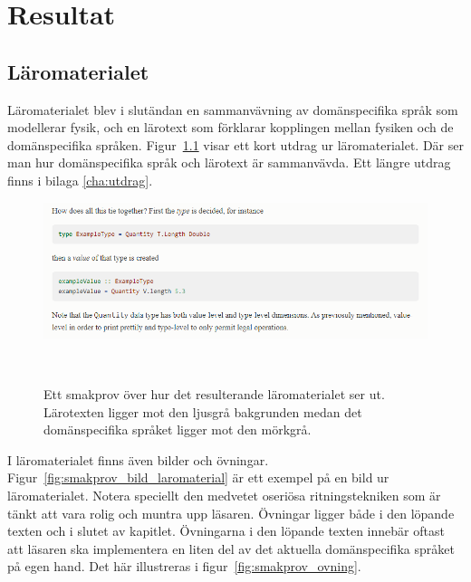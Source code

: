 
\chapter{Resultat}

\begin{draft}

\section{Läromaterialet}

Läromaterialet blev i slutändan en sammanvävning av domänspecifika språk som
modellerar fysik, och en lärotext som förklarar kopplingen mellan fysiken och de
domänspecifika språken. Figur~\ref{fig:smakprov_laromaterial} visar ett kort
utdrag ur läromaterialet. Där ser man hur domänspecifika språk och lärotext är
sammanvävda. Ett längre utdrag finns i bilaga \ref{cha:utdrag}.

\begin{figure}[tph]
  \includegraphics[width=\linewidth]{figure/smakprov_laromaterial.png}
  \caption{Ett smakprov över hur det resulterande läromaterialet ser ut.
           Lärotexten ligger mot den ljusgrå bakgrunden medan det
           domänspecifika språket ligger mot den
           mörkgrå.}~\label{fig:smakprov_laromaterial} 
\end{figure}

I läromaterialet finns även bilder och övningar. Figur~\ref{fig:smakprov_bild_laromaterial} är ett exempel på en bild ur läromaterialet. Notera speciellt den medvetet oseriösa ritningstekniken som är tänkt att vara rolig och muntra upp läsaren. Övningar ligger både i den löpande texten och i slutet av kapitlet. Övningarna i den löpande texten innebär oftast att läsaren ska implementera en liten del av det aktuella domänspecifika språket på egen hand. Det här illustreras i figur~\ref{fig:smakprov_ovning}.


\end{draft}
